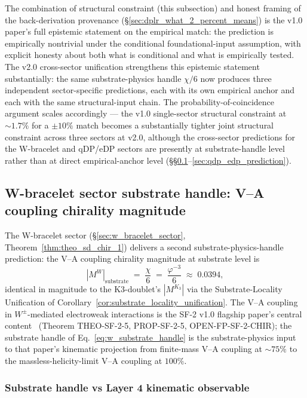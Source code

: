 \documentclass[11pt,letterpaper]{article}
\newcommand{\phig}{\varphi}
\newcommand{\Kthree}{\ensuremath{K_3}}
\begin{document}
The combination of structural constraint (this subsection) and honest framing of the back-derivation provenance (\S\ref{sec:dplr_what_2_percent_means}) is the v1.0 paper's full epistemic statement on the empirical match: the prediction is empirically nontrivial under the conditional foundational-input assumption, with explicit honesty about both what is conditional and what is empirically tested. The v2.0 cross-sector unification strengthens this epistemic statement substantially: the same substrate-physics handle $\chi/6$ now produces three independent sector-specific predictions, each with its own empirical anchor and each with the same structural-input chain. The probability-of-coincidence argument scales accordingly --- the v1.0 single-sector structural constraint at $\sim 1.7\%$ for a $\pm 10\%$ match becomes a substantially tighter joint structural constraint across three sectors at v2.0, although the cross-sector predictions for the W-bracelet and qDP/eDP sectors are presently at substrate-handle level rather than at direct empirical-anchor level (\S\S\ref{sec:w_bracelet_prediction}--\ref{sec:qdp_edp_prediction}).

\subsection{W-bracelet sector substrate handle: V--A coupling chirality magnitude}\label{sec:w_bracelet_prediction}

The W-bracelet sector (\S\ref{sec:w_bracelet_sector}, Theorem~\ref{thm:theo_sd_chir_1}) delivers a second substrate-physics-handle prediction: the V--A coupling chirality magnitude at substrate level is
\begin{equation}\label{eq:w_substrate_handle}
|M^W|_{\text{substrate}} \;=\; \frac{\chi}{6} \;=\; \frac{\phig^{-3}}{6} \;\approx\; 0.0394,
\end{equation}
identical in magnitude to the K3-doublet's $|M^{\Kthree}|$ via the Substrate-Locality Unification of Corollary~\ref{cor:substrate_locality_unification}. The V--A coupling in $W^\pm$-mediated electroweak interactions is the SF-2 v1.0 flagship paper's central content~\cite{abshier_sf2} (Theorem THEO-SF-2-5, PROP-SF-2-5, OPEN-FP-SF-2-CHIR); the substrate handle of Eq.~\eqref{eq:w_substrate_handle} is the substrate-physics input to that paper's kinematic projection from finite-mass V--A coupling at $\sim 75\%$ to the massless-helicity-limit V--A coupling at $100\%$.

\subsubsection{Substrate handle vs Layer 4 kinematic observable}\label{sec:w_layer4_distinction}
\end{document}
